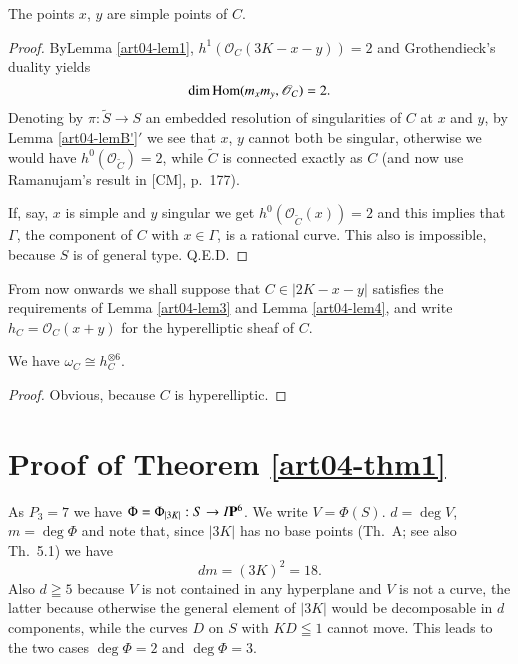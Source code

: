 \begin{lem}\label{art04-lem4}
The points $x$, $y$ are simple points of $C$.
\end{lem}

\begin{proof}
By\pageoriginale Lemma \ref{art04-lem1}, $h^{1}(\mathscr{O}_{C}(3K-x-y))=2$ and
Grothendieck's duality yields
$$
\dim \operatorname{Hom}(m_{x}m_{y},\mathscr{O}_{C})=2.
$$
Denoting by $\pi:\widetilde{S}\to S$ an embedded resolution of
singularities of $C$ at $x$ and $y$, by Lemma \ref{art04-lemB'}$'$ we
see that $x$, $y$ cannot both be singular, otherwise we would have
$h^{0}(\mathscr{O}_{\widetilde{C}})=2$, while $\widetilde{C}$ is
connected exactly as $C$ (and now use Ramanujam's result
in  [CM], p.~177).

If, say, $x$ is simple and $y$ singular we get
$h^{0}(\mathscr{O}_{\widetilde{C}}(x))=2$ and this implies that
$\Gamma$, the component of $C$ with $x\in \Gamma$, is a rational
curve. This also is impossible, because $S$ is of general type. Q.E.D.
\end{proof}

From now onwards we shall suppose that $C\in |2K-x-y|$ satisfies the
requirements of Lemma \ref{art04-lem3} and Lemma \ref{art04-lem4}, and
write $h_{C}=\mathscr{O}_{C}(x+y)$ for the hyperelliptic sheaf of $C$.

\begin{lem}\label{art04-lem5}
We have $\omega_{C}\cong h^{\otimes 6}_{C}$.
\end{lem}

\begin{proof}
Obvious, because $C$ is hyperelliptic.
\end{proof}

\section{Proof of Theorem \ref{art04-thm1}}\label{art04-sec4}

As $P_{3}=7$ we have $\Phi=\Phi_{|3K|}:S\to I\mathbf{P}^{6}$. We write
$V=\Phi(S)$. $d=\deg V$, $m=\deg \Phi$ and note that, since $|3K|$ has
no base points (\cite{art04-key5}Th.~A; see
also \cite{art04-key2}Th.~5.1) we have
$$
dm=(3K)^{2}=18.
$$
Also $d\geqq 5$ because $V$ is not contained in any hyperplane and $V$
is not a curve, the latter because otherwise the general element of
$|3K|$ would be decomposable in $d$ components, while the curves $D$
on $S$ with $KD\leqq 1$ cannot move. This leads to the two cases
$\deg \Phi=2$ and $\deg\Phi=3$.

